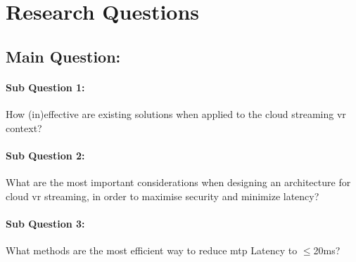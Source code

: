 \section{Research Questions}

\subsection*{Main Question:} 
\paragraph{Sub Question 1:} How (in)effective are existing solutions when applied to the cloud streaming \acrshort{vr} context?
\paragraph{Sub Question 2:} What are the most important considerations when designing an architecture for cloud \acrshort{vr} streaming, in order to maximise security and minimize latency?
\paragraph{Sub Question 3:} What methods are the most efficient way to reduce \acrfull{mtp} Latency to $\leq$20\acrshort{ms}?
